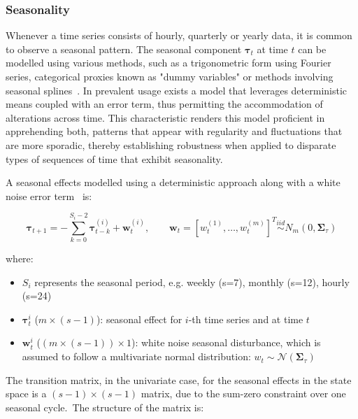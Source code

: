 \subsubsection{Seasonality}
    \label{sec:seasonality_component}

    Whenever a time series consists of hourly, quarterly or yearly data, it is common to observe a seasonal pattern.
    The seasonal component $\bm{\tau}_{t}$ at time $t$ can be modelled using various methods,
    such as a trigonometric form using Fourier series, categorical proxies known as "dummy variables"
    or methods involving seasonal splines~\cite{proietti_seasonality_2023}.
    In prevalent usage exists a model that leverages deterministic means coupled with an error term,
    thus permitting the accommodation of alterations across time.
    This characteristic renders this model proficient in apprehending both,
    patterns that appear with regularity and fluctuations that are more sporadic,
    thereby establishing robustness when applied to disparate types of sequences of time that exhibit seasonality.

    A seasonal effects modelled using a deterministic approach along with a white noise error term~\cite{qiu_multivariate_2018} is:

    \begin{equation}
        \bm{\tau}_{t+1} = - \sum_{k=0}^{S_{i}-2} \bm{\tau}_{t-k}^{(i)} + \bm{w}_{t}^{(i)},
            \qquad \bm{w}_{t} = [w_{t}^{(1)}, \ldots, w_{t}^{(m)}]^{T}
            \stackrel{\textit{iid}}{\sim} N_{m}(0, \bm{\Sigma}_{\tau})
        \label{eq:seasonal}
    \end{equation}

    where:
    \begin{itemize}
        \item $S_{i}$ represents the seasonal period, e.g. weekly (s=7), monthly (s=12), hourly (s=24)
        \item $\bm{\tau}_{t}^{i}$ ($m \times (s-1)$): seasonal effect for $i$-th time series and at time $t$
        \item $\bm{w}_{t}^{i}$ ($(m \times (s-1)) \times 1$): white noise seasonal disturbance,
            which is assumed to follow a multivariate normal distribution: $w_{t} \sim \mathcal{N}(\bm{\Sigma}_{\tau})$
    \end{itemize}

    The transition matrix, in the univariate case, for the seasonal effects in the state space is a $(s-1) \times (s-1)$ matrix,
    due to the sum-zero constraint over one seasonal cycle.\ The structure of the matrix is:

